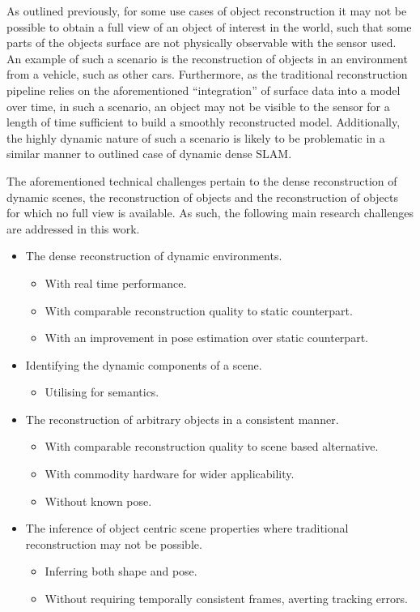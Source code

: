 As outlined previously, for some use cases of object reconstruction it may not be possible to obtain a 
full view of an object of interest in the world, such that some parts of the objects surface are not 
physically observable with the sensor used. An example of such a scenario is the reconstruction of 
objects in an environment from a vehicle, such as other cars. Furthermore, as the traditional reconstruction 
pipeline relies on the aforementioned ``integration'' of surface data into a model over time, in such a 
scenario, an object may not be visible to the sensor for a length of time sufficient to build a smoothly 
reconstructed model. Additionally, the highly dynamic nature of such a scenario is likely to be problematic 
in a similar manner to outlined case of dynamic dense SLAM\@.

The aforementioned technical challenges pertain to the dense reconstruction of dynamic scenes, the 
reconstruction of objects and the reconstruction of objects for which no full view is available. As 
such, the following main research challenges are addressed in this work.
\begin{itemize}
  \item The dense reconstruction of dynamic environments.
  \begin{itemize}
    \item With real time performance.
    \item With comparable reconstruction quality to static counterpart.
    \item With an improvement in pose estimation over static counterpart.
  \end{itemize}
  \item Identifying the dynamic components of a scene.
  \begin{itemize}
    \item Utilising for semantics.
  \end{itemize}
  \item The reconstruction of arbitrary objects in a consistent manner.
  \begin{itemize}
    \item With comparable reconstruction quality to scene based alternative.
    \item With commodity hardware for wider applicability.
    \item Without known pose.
  \end{itemize}
  \item The inference of object centric scene properties where traditional reconstruction 
may not be possible.
  \begin{itemize}
    \item Inferring both shape and pose.
    \item Without requiring temporally consistent frames, averting tracking errors.
  \end{itemize}
\end{itemize}

